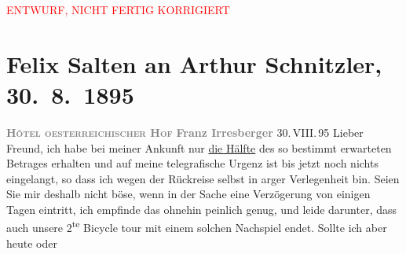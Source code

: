 
\begin{center}
            \textcolor{red}{ENTWURF, NICHT FERTIG KORRIGIERT}
                      \end{center}
            
         
         \renewcommand{\erwaehntePersonen}{Personen: Lou Andreas-Salomé, Richard Beer-Hofmann, Siegfried Bing, Emma Fr., Vincent van Gogh, Paul Goldmann, Franz Irresberger, Karl Kraus, Charlotte Pohl-Glas, Adele Sandrock}
         \renewcommand{\erwaehnteOrte}{Orte: Asien, Bad Ischl, Gmunden, Japan, München, Paris, Salzburg, Wien, Österreichischer Hof}
         \renewcommand{\erwaehnteWerke}{Werke: Ischler Brief. (Wiener Dichter auf der Esplanade), Wiener Familien-Journal}
               \section[Felix Salten an Arthur Schnitzler, 30. 8. 1895]{ Felix Salten an Arthur Schnitzler, 30. 8. 1895}\nopagebreak{}\rehead{ }\begin{ledgroupsized}[t]{13cm}\normalsize\beginnumbering \toendnotes[C]{\smallbreak\pagebreak[2]} 
\toendnotes[C]{\smallbreak}\pstart
           \noindent{}\centering{}{\pb}\textcolor{gray}{\textbf{\textsc{Hôtel
                           oesterreichischer Hof}}}\pend
           \pstart
           \noindent{}\centering{}\textcolor{gray}{\textbf{Franz
                     Irresberger}}\pend
           \pstart
           \raggedleft{}30. VIII. 95\pend
           \pstart
           Lieber Freund, ich habe bei meiner Ankunft nur \uline{die Hälfte} des so bestimmt erwarteten Betrages erhalten und auf meine
               telegrafische Urgenz ist bis jetzt noch nichts eingelangt, so dass ich wegen der
               Rückreise selbst in arger Verlegenheit bin. Seien Sie mir deshalb nicht böse, wenn in
               der Sache eine Verzögerung von einigen Tagen eintritt, ich empfinde das ohnehin
               peinlich genug, und leide darunter, dass auch unsere 2\textsuperscript{te}
               Bicycle tour mit einem solchen Nachspiel endet. Sollte ich aber heute oder

\end{ledgroupsized}
